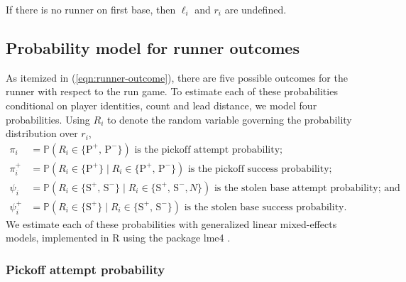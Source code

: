 \documentclass{article}
\begin{document}
    If there is no runner on first base, then $\ell_i$ and $r_i$ are undefined.%

    \subsection{Probability model for runner outcomes}
    \label{sec:prob-runner-outcome}

      As itemized in (\ref{eqn:runner-outcome}), there are five possible outcomes for the runner with respect to the run game. To estimate each of these probabilities conditional on player identities, count and lead distance, we model four probabilities. Using $R_i$ to denote the random variable governing the probability distribution over $r_i$,
      \begin{align*}
        \pi_i    &= \mathbb{P}(R_i \in \{\mbox{P}^+,\, \mbox{P}^-\}) \mbox{ is the pickoff attempt probability;}\\
        \pi_i^+  &= \mathbb{P}(R_i \in \{\mbox{P}^+\} \mid R_i \in \{\mbox{P}^+,\, \mbox{P}^-\}) \mbox{ is the pickoff success probability;}\\
        \psi_i   &= \mathbb{P}(R_i \in \{\mbox{S}^+,\, \mbox{S}^-\} \mid R_i \in \{\mbox{S}^+,\, \mbox{S}^-, N\}) \mbox{ is the stolen base attempt probability; and}\\
        \psi_i^+ &= \mathbb{P}(R_i \in \{\mbox{S}^+\} \mid R_i \in \{\mbox{S}^+,\, \mbox{S}^-\}) \mbox{ is the stolen base success probability.}
      \end{align*}
      We estimate each of these probabilities with generalized linear mixed-effects models, implemented in R using the package lme4 \citep{bates_fitting_2015}.

      \subsubsection{Pickoff attempt probability}
      \label{sec:prob-po-attempt}
\end{document}
